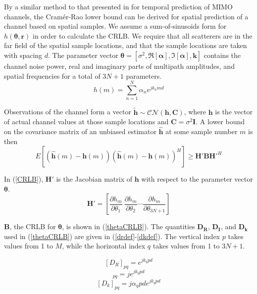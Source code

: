 \documentclass[conference]{ieeetran}
\begin{document}
By a similar method to that presented in \cite{svantesson2003} for temporal prediction of MIMO channels, the Cram\'er-Rao lower bound can be derived for spatial prediction of a channel based on spatial samples.  We assume a sum-of-sinusoids form for $h(\boldsymbol{\theta},\mathbf{r})$ in order to calculate the CRLB. We require that all scatterers are in the far field of the spatial sample locations, and that the sample locations are taken with spacing $d$.  The parameter vector $\boldsymbol{\theta}= [\sigma^2, \Re[\boldsymbol{\alpha}], \Im[\boldsymbol{\alpha}], \mathbf{k}]$ contains the channel noise power, real and imaginary parts of multipath amplitudes, and spatial frequencies for a total of $3N+1$ parameters. 
\begin{equation}
h(m) = \sum_{n=1}^N \alpha_n e^{j k_n m d}
\end{equation}

Observations of the channel form a vector $\mathbf{\tilde{h}} \sim \mathcal{CN}(\mathbf{h}, \mathbf{C})$, where $\mathbf{h}$ is the vector of actual channel values at those sample locations and $\mathbf{C}=\sigma^2\mathbf{I}$. A lower bound on the covariance matrix of an unbiased estimator $\mathbf{\hat{h}}$ at some sample number $m$ is then
\begin{equation} \label{CRLB}
E\left[\left(\mathbf{\hat{h}}(m)-\mathbf{h}(m)\right)\left(\mathbf{\hat{h}}(m)-\mathbf{h}(m)\right)^H\right]\geq \mathbf{H'BH'}^H
\end{equation}

In   (\ref{CRLB}), $\mathbf{H'}$ is the Jacobian matrix of $\mathbf{h}$ with respect to the parameter vector $\boldsymbol{\theta}$.
\begin{equation}
\mathbf{H'} = \left[ \frac{\partial h_m}{\partial\theta_1} \ \frac{\partial h_m}{\partial\theta_2} \cdots \frac{\partial h_m}{\partial\theta_{3N+1}} \right]
\end{equation}

$\mathbf{B}$, the CRLB for $\boldsymbol{\theta}$, is shown in (\ref{thetaCRLB}). The quantities $\mathbf{D_R}$, $\mathbf{D_I}$, and $\mathbf{D_k}$ used in (\ref{thetaCRLB}) are given in (\ref{drdef}-\ref{dkdef}).  The vertical index $p$ takes values from 1 to $M$, while the horizontal index $q$ takes values from 1 to $3N+1$.
\addtocounter{equation}{1}
\begin{equation}\label{drdef}
[D_R]_{pq} = e^{jk_q p d}
\end{equation}
\begin{equation}
[D_I]_{pq} = je^{jk_q p d}
\end{equation}
\begin{equation}\label{dkdef}
[D_k]_{pq} = j\alpha_q p d e^{jk_q p d}
\end{equation}
\end{document}
